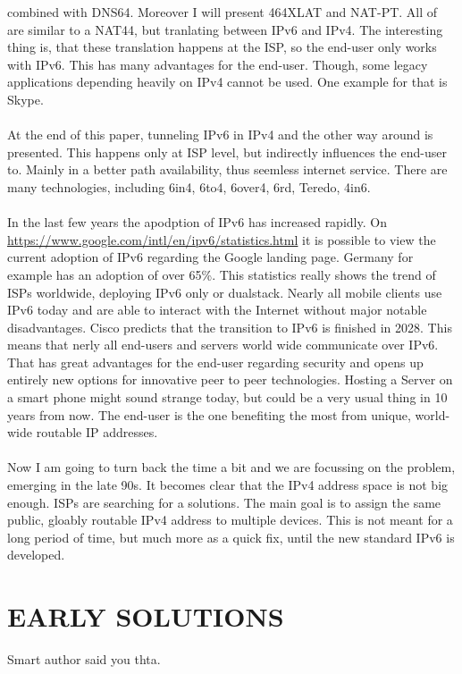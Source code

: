 \documentclass[format=sigconf, natbib=true, nonacm=true]{acmart}
\begin{document}
combined with DNS64. Moreover I will present 464XLAT and NAT-PT. All of are similar to a NAT44, but tranlating between IPv6 and IPv4. The interesting thing is, that these translation happens at the ISP, so the end-user only works with IPv6. This has many advantages for the end-user. Though, some legacy applications depending heavily on IPv4 cannot be used. One example for that is Skype.\\\\At the end of this paper, tunneling IPv6 in IPv4 and the other way around is presented. This happens only at ISP level, but indirectly influences the end-user to. Mainly in a better path availability, thus seemless internet service. There are many technologies, including 6in4, 6to4, 6over4, 6rd, Teredo, 4in6.\\\\In the last few years the apodption of IPv6 has increased rapidly. On \url{https://www.google.com/intl/en/ipv6/statistics.html} it is possible to view the current adoption of IPv6 regarding the Google landing page. Germany for example has an adoption of over 65\%. This statistics really shows the trend of ISPs worldwide, deploying IPv6 only or dualstack. Nearly all mobile clients use IPv6 today and are able to interact with the Internet without major notable disadvantages. Cisco predicts that the transition to IPv6 is finished in 2028. This means that nerly all end-users and servers world wide communicate over IPv6. That has great advantages for the end-user regarding security and opens up entirely new options for innovative peer to peer technologies. Hosting a Server on a smart phone might sound strange today, but could be a very usual thing in 10 years from now. The end-user is the one benefiting the most from unique, world-wide routable IP addresses.\\\\Now I am going to turn back the time a bit and we are focussing on the problem, emerging in the late 90s. It becomes clear that the IPv4 address space is not big enough. ISPs are searching for a solutions. The main goal is to assign the same public, gloably routable IPv4 address to multiple devices. This is not meant for a long period of time, but much more as a quick fix, until the new standard IPv6 is developed.
    

    \section{EARLY SOLUTIONS}
    \lipsum[11]
    Smart author said you\cite{7119767} thta.
\end{document}
